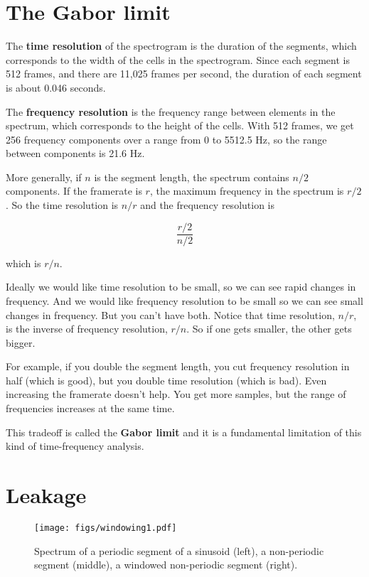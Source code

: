 \documentclass[12pt]{book} \usepackage[width=5.5in,height=8.5in, hmarginratio=3:2,vmarginratio=1:1]{geometry}
\begin{document}
\section{The Gabor limit} \label{gabor} 

The {\bf time resolution} of the spectrogram is the duration of the segments, which corresponds to the width of the cells in the spectrogram. Since each segment is 512 frames, and there are 11,025 frames per second, the duration of each segment is about 0.046 seconds. 

The {\bf frequency resolution} is the frequency range between elements in the spectrum, which corresponds to the height of the cells. With 512 frames, we get 256 frequency components over a range from 0 to 5512.5 Hz, so the range between components is 21.6 Hz. 

More generally, if $n$ is the segment length, the spectrum contains $n/2$ components. If the framerate is $r$, the maximum frequency in the spectrum is $r/2$. So the time resolution is $n/r$ and the frequency resolution is 

%
\[ \frac{r/2}{n/2} \] 

%
which is $r/n$. 

Ideally we would like time resolution to be small, so we can see rapid changes in frequency. And we would like frequency resolution to be small so we can see small changes in frequency. But you can't have both. Notice that time resolution, $n/r$, is the inverse of frequency resolution, $r/n$. So if one gets smaller, the other gets bigger. 

For example, if you double the segment length, you cut frequency resolution in half (which is good), but you double time resolution (which is bad). Even increasing the framerate doesn't help. You get more samples, but the range of frequencies increases at the same time. 

This tradeoff is called the {\bf Gabor limit} and it is a fundamental limitation of this kind of time-frequency analysis. 

\section{Leakage} 

\begin{figure} 

\centerline{\texttt{[image: figs/windowing1.pdf]}} \caption{Spectrum of a periodic segment of a sinusoid (left), a non-periodic segment (middle), a windowed non-periodic segment (right).} \label{fig.windowing1} \end{figure} 
\end{document}
